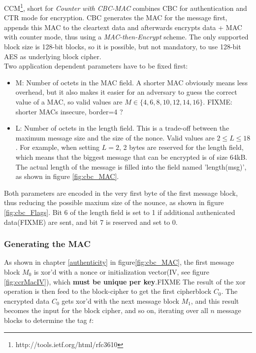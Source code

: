 CCM\footnote{http://tools.ietf.org/html/rfc3610}, short for \textit{Counter with CBC-MAC} combines CBC for authentication and CTR mode for encryption.
CBC generates the MAC for the message first, appends this MAC to the cleartext data and afterwards encrypts data + MAC with counter mode, thus using a
\textit{MAC-then-Encrypt} scheme. The only
supported block size is 128-bit blocks, so it is possible, but not mandatory, to use 128-bit AES as underlying block cipher.
\\
Two application dependent parameters have to be fixed first: 
\begin{itemize}
 \item M: Number of octets in the MAC field. A shorter MAC obviously means less overhead, but it also makes it easier for an adversary to guess the correct
 value of a MAC, so valid values are $M \in \{4, 6, 8, 10, 12, 14, 16\}$. FIXME: shorter MACs insecure, border=4 ? 
 \item L: Number of octets in the length field. This is a trade-off between the maximum message size and the size of the nonce. Valid values are $2 \leq L \leq 18$.
 For example, when setting $L = 2$, 2 bytes are reserved for the length field, which means that the biggest message that can be encrypted is of size 64kB. The actual
 length of the message is filled into the field named 'length(msg)', as shown in figure \ref{fig:cbc_MAC}.
\end{itemize}

Both parameters are encoded in the very first byte of the first message block, thus reducing the possible maxium size of the nounce, as shown in figure \ref{fig:cbc_Flags}.
Bit 6 of the length field is set to 1 if additional authenicated data(FIXME) are sent, and bit 7 is reserved and set to 0.


\subsubsection{Generating the MAC}

As shown in chapter \ref{authenticity} in figure\ref{fig:cbc_MAC}, the first message block $M_0$ is \gls{xor}'d with a nonce or initialization vector(IV, see figure
\ref{fig:ccrMacIV}), which \textbf{must be unique per key}.FIXME
The result of the \gls{xor} operation is then feed to the block-cipher to get the first cipherblock $C_0$. The encrypted data $C_0$ gets \gls{xor}'d with the next message block $M_1$, and this
result becomes the input for the block cipher, and so on, iterating over all $n$ message blocks to determine the tag $t$:

